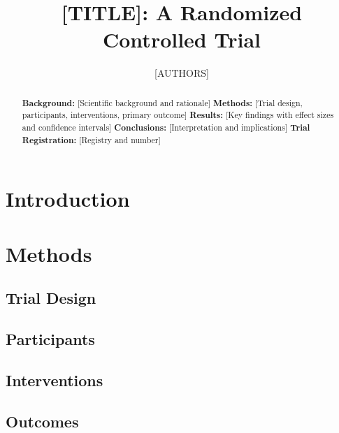 \documentclass[12pt]{article}
\title{[TITLE]: A Randomized Controlled Trial}
\author{[AUTHORS]}
\date{}
\begin{document}
\maketitle

\begin{abstract}
\textbf{Background:} [Scientific background and rationale]
\textbf{Methods:} [Trial design, participants, interventions, primary outcome]
\textbf{Results:} [Key findings with effect sizes and confidence intervals]
\textbf{Conclusions:} [Interpretation and implications]
\textbf{Trial Registration:} [Registry and number]
\end{abstract}

\section{Introduction}

\section{Methods}

\subsection{Trial Design}

\subsection{Participants}

\subsection{Interventions}

\subsection{Outcomes}
\end{document}
